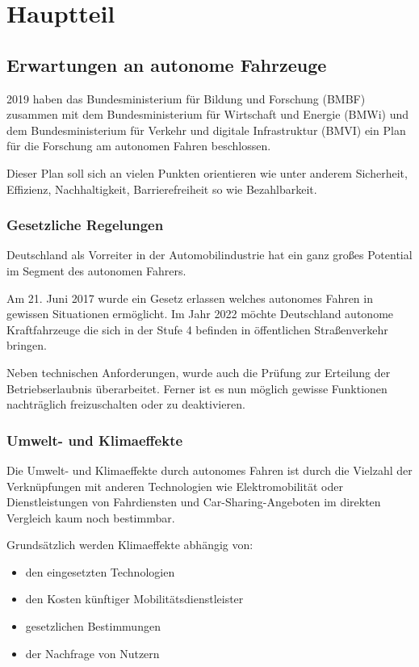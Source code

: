 \chapter{Hauptteil}



\section{Erwartungen an autonome Fahrzeuge}
2019 haben das
Bundesministerium für Bildung und Forschung (BMBF) zusammen mit dem
Bundesministerium für Wirtschaft und Energie (BMWi) und dem
Bundesministerium für Verkehr und digitale Infrastruktur (BMVI)
ein Plan für die Forschung am autonomen Fahren beschlossen.

Dieser Plan soll sich an vielen Punkten orientieren wie unter anderem Sicherheit, Effizienz, Nachhaltigkeit, Barrierefreiheit so wie Bezahlbarkeit.

\subsection{Gesetzliche Regelungen}
Deutschland als Vorreiter in der Automobilindustrie hat ein ganz großes Potential im Segment des autonomen Fahrers.

Am 21. Juni 2017 wurde ein Gesetz erlassen welches autonomes Fahren in gewissen Situationen ermöglicht.
Im Jahr 2022 möchte Deutschland autonome Kraftfahrzeuge die sich in der Stufe 4 befinden in öffentlichen Straßenverkehr bringen.

Neben technischen Anforderungen, wurde auch die Prüfung zur Erteilung der Betriebserlaubnis überarbeitet.
Ferner ist es nun möglich gewisse Funktionen nachträglich freizuschalten oder zu deaktivieren.
\cite{gesetztautonomes}

\subsection{Umwelt- und Klimaeffekte}
Die Umwelt- und Klimaeffekte durch autonomes Fahren ist durch die Vielzahl der Verknüpfungen mit anderen Technologien wie Elektromobilität
oder Dienstleistungen von Fahrdiensten und Car-Sharing-Angeboten im direkten Vergleich kaum noch bestimmbar.

Grundsätzlich werden Klimaeffekte abhängig von:
\begin{itemize}
	\item den eingesetzten Technologien
	\item den Kosten künftiger Mobilitätsdienstleister
	\item gesetzlichen Bestimmungen
	\item der Nachfrage von Nutzern
\end{itemize}

